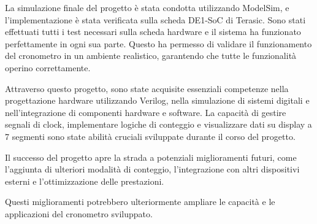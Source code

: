 \documentclass{article}
\begin{document}
La simulazione finale del progetto è stata condotta utilizzando ModelSim, e l'implementazione è stata verificata sulla scheda DE1-SoC di Terasic. Sono stati effettuati tutti i test necessari sulla scheda hardware e il sistema ha funzionato perfettamente in ogni sua parte. Questo ha permesso di validare il funzionamento del cronometro in un ambiente realistico, garantendo che tutte le funzionalità operino correttamente.

Attraverso questo progetto, sono state acquisite essenziali competenze nella progettazione hardware utilizzando Verilog, nella simulazione di sistemi digitali e nell'integrazione di componenti hardware e software. La capacità di gestire segnali di clock, implementare logiche di conteggio e visualizzare dati su display a 7 segmenti sono state abilità cruciali sviluppate durante il corso del progetto.

Il successo del progetto apre la strada a potenziali miglioramenti futuri, come l'aggiunta di ulteriori modalità di conteggio, l'integrazione con altri dispositivi esterni e l'ottimizzazione delle prestazioni.

Questi miglioramenti potrebbero ulteriormente ampliare le capacità e le applicazioni del cronometro sviluppato.
\end{document}
